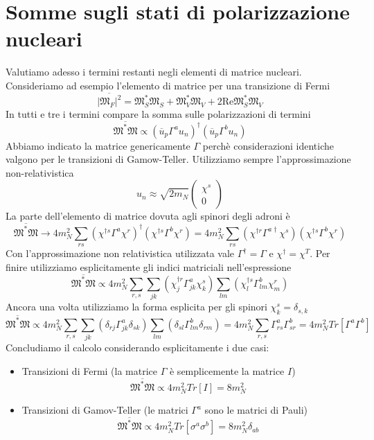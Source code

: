 \section{Somme sugli stati di polarizzazione nucleari}
Valutiamo adesso i termini restanti negli elementi di matrice nucleari. Consideriamo ad esempio l'elemento di matrice per una transizione di Fermi
$$
\overline{|\mathfrak{M}_F|^2} = \mathfrak{M}_S^* \mathfrak{M}_S + \mathfrak{M}_V^* \mathfrak{M}_V + 2 \text{Re} \mathfrak{M}_S^* \mathfrak{M}_V
$$
In tutti e tre i termini compare la somma sulle polarizzazioni di termini
$$
\overline{\mathfrak{M}^* \mathfrak{M}} \propto (\overline{u}_p \Gamma^a u_n)^\dagger (\overline{u}_p \Gamma^b u_n)
$$
Abbiamo indicato la matrice genericamente $\Gamma$ perchè considerazioni identiche valgono per le transizioni di Gamow-Teller. Utilizziamo sempre l'approssimazione non-relativistica
$$
u_n \approx \sqrt{2m_N} \begin{pmatrix} \chi^s \\ 0 \end{pmatrix}
$$
La parte dell'elemento di matrice dovuta agli spinori degli adroni è
$$
\overline{\mathfrak{M}^* \mathfrak{M}} \to 4m_N^2 \sum_{rs} (\chi^{\dagger s} \Gamma^a \chi^r)^\dagger (\chi^{\dagger s} \Gamma^b \chi^r) = 4m_N^2 \sum_{rs} (\chi^{\dagger r} \Gamma^{a\dagger} \chi^s) (\chi^{\dagger s} \Gamma^b \chi^r)
$$
Con l'approssimazione non relativistica utilizzata vale $\Gamma^\dagger=\Gamma$ e $\chi^\dagger=\chi^{T}$. Per finire utilizziamo esplicitamente gli indici matriciali nell'espressione
$$
\overline{\mathfrak{M}^* \mathfrak{M}} \propto 4m_N^2 \sum_{r,s} \sum_{jk} (\chi_j^{\dagger r} \Gamma^a_{jk} \chi_k^s) \sum_{lm} (\chi_l^{\dagger s} \Gamma^b_{lm} \chi_m^r)
$$
Ancora una volta utilizziamo la forma esplicita per gli spinori $\chi_k^s=\delta_{s,k}$
$$
\overline{\mathfrak{M}^* \mathfrak{M}} \propto 4m_N^2 \sum_{r,s} \sum_{jk} (\delta_{rj} \Gamma^a_{jk} \delta_{sk}) \sum_{lm} (\delta_{sl} \Gamma^b_{lm} \delta_{rm}) = 4m_N^2 \sum_{r,s} \Gamma^a_{rs} \Gamma^b_{sr} = 4m_N^2 Tr[\Gamma^a \Gamma^b]
$$
Concludiamo il calcolo considerando esplicitamente i due casi:
\begin{itemize}
    \item Transizioni di Fermi (la matrice $\Gamma$ è semplicemente la matrice $I$)
    $$
    \overline{\mathfrak{M}^* \mathfrak{M}} \propto 4m_N^2 Tr[I] = 8m_N^2
    $$
    \item Transizioni di Gamov-Teller (le matrici $\Gamma^a$ sono le matrici di Pauli)
    $$
    \overline{\mathfrak{M}^* \mathfrak{M}} \propto 4m_N^2 Tr[\sigma^a \sigma^b] = 8m_N^2 \delta_{ab}
    $$
\end{itemize}
